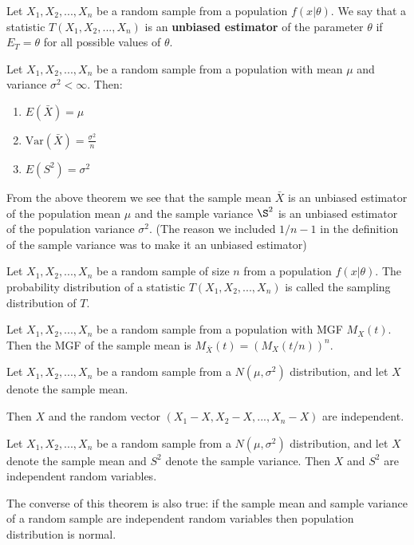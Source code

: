 \begin{defn}
    Let $X_1, X_2, ..., X_n$ be a random sample from a population $f\left (x| \theta\right )$. We say that a statistic $T\left (X_1, X_2, ...,X_n\right )$ is an \textbf{unbiased estimator} of the parameter $\theta$ if $E_T = \theta$ for all possible values of $\theta$.
\end{defn}

\begin{thm}
    Let $X_1, X_2, ..., X_n$ be a random sample from a population with mean $\mu $ and variance $\sigma ^2 < \infty$. Then:
    \begin{enumerate}
        \item $E\left (\bar{X}\right ) = \mu $
        \item $\text{Var}\left (\bar{X}\right ) = \frac{\sigma ^2}{n}$
        \item $E\left (S ^2\right ) = \sigma ^2$
    \end{enumerate}
\end{thm}

From the above theorem we see that the sample mean $\bar{X}$ is an unbiased estimator of the population mean $\mu$ and the sample variance $\S^2$ is an unbiased estimator of the population variance $\sigma^2$. (The reason we included $1/n-1$ in the  definition of the sample variance was to make it an unbiased estimator)

\begin{defn}
    Let $X_1, X_2, ..., X_n$ be a random sample of size $n$ from a population $f(x|\theta)$. The probability distribution of a statistic $T(X_1, X_2, ..., X_n)$ is called the sampling distribution of $T$.
\end{defn}

\begin{thm}
    Let $X_1, X_2, ..., X_n$ be a random sample from a population with MGF $M_X(t)$. Then the MGF of the sample mean is $M_{\bar{X}} (t) = (M_X (t/n))^n$.
\end{thm}

\begin{thm}
    Let $X_1, X_2, . . . , X_n$ be a random sample from a $N(\mu, \sigma^2)$ distribution, and let $X$ denote the sample mean.

    Then $X$ and the random vector $(X_1 - X, X_2 - X, . . . , X_n - X)$ are independent.
\end{thm}

\begin{thm}
    Let $X_1, X_2, . . . , X_n$ be a random sample from a $N(\mu, \sigma^2)$ distribution, 
    and let $X$ denote the sample mean and $S^2$ denote the sample variance. Then $X$ and $S^2$ are independent random variables.
\end{thm}
The converse of this theorem is also true: if the sample mean and sample variance of a random sample are independent random variables then population distribution is normal.
